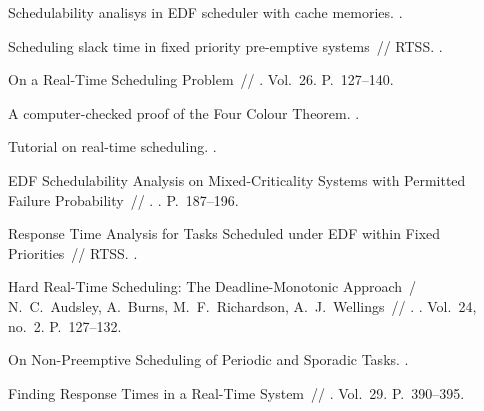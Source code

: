 \begin{thebibliography}{10}
 Schedulability analisys in EDF
  scheduler with cache memories. \BibDash
{}.

 Scheduling slack time in fixed
  priority pre-emptive systems~// RTSS. \BibDash
{}.

 On a Real-Time Scheduling Problem~//
  \href{http://dx.doi.org/10.1287/opre.26.1.127}{} \BibDash
{}. \BibDash
\newblock Vol.~26. \BibDash
\newblock P.~127--140.

 A computer-checked proof of the Four Colour Theorem.
  \BibDash
{}.

 Tutorial on real-time scheduling. \BibDash
{}.

 EDF Schedulability Analysis on
  Mixed-Criticality Systems with Permitted Failure Probability~// . \BibDash
{}. \BibDash
\newblock P.~187--196.

 Response Time Analysis for Tasks
  Scheduled under EDF within Fixed Priorities~// RTSS. \BibDash
{}.

Hard Real-Time Scheduling: The Deadline-Monotonic Approach~/ N.~C.~Audsley,
  A.~Burns, M.~F.~Richardson, A.~J.~Wellings~// . \BibDash
{}. \BibDash
\newblock Vol.~24, no.~2. \BibDash
\newblock P.~127--132.

 On Non-Preemptive Scheduling of
  Periodic and Sporadic Tasks. \BibDash
{}.

 Finding Response Times in a Real-Time
  System~//  \BibDash
{}. \BibDash
\newblock Vol.~29. \BibDash
\newblock P.~390--395.


\end{thebibliography}
